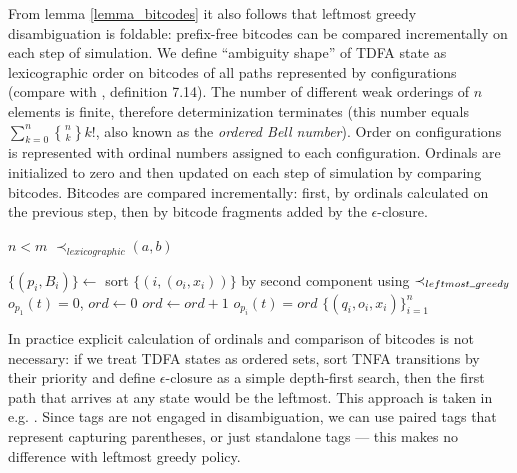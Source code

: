 \documentclass{article}
\newcommand{\Xset}{\!\leftarrow\!}
\newcommand{\Xund}{\rule{.4em}{.4pt}} %
\newcommand{\Xeq}{\!=\!}
\newcommand{\Xstirling}[2]{\genfrac{\{}{\}}{0pt}{}{#1}{#2}}
\theoremstyle{definition}
\begin{document}
\begin{multicols}{2}
From lemma \ref{lemma_bitcodes} it also follows that leftmost greedy disambiguation is foldable:
prefix-free bitcodes can be compared incrementally on each step of simulation.
We define ``ambiguity shape'' of TDFA state as lexicographic order on bitcodes of all paths represented by configurations
(compare with \cite{Gra15}, definition 7.14).
The number of different weak orderings of $n$ elements is finite, therefore determinization terminates
(this number equals $\sum_{k=0}^n \Xstirling{n}{k} k!$, also known as the \emph{ordered Bell number}).
Order on configurations is represented with ordinal numbers assigned to each configuration.
Ordinals are initialized to zero and then updated on each step of simulation by comparing bitcodes.
Bitcodes are compared incrementally:
first, by ordinals calculated on the previous step, then by bitcode fragments added by the $\epsilon$-closure.
\\

    \begin{algorithm}[H] \DontPrintSemicolon {} 
    \Fn {$\underline{\prec_{leftmost \Xund greedy} ((n, a), (m, b))} \smallskip$} {
         {\Return $n \!<\! m$}
        \Return $\prec_{lexicographic} (a, b)$ \;
    }
    \end{algorithm}


    \begin{algorithm}[H] \DontPrintSemicolon {}   
     {
        $\{(p_i, B_i)\} \Xset $ sort $\{(i, (o_i, x_i))\}$ by second component using $\prec_{leftmost \Xund greedy}$ \;
        \Let $o_{p_1}(t) \Xeq 0$, $ord \Xset 0$ \;
        \For {$i \Xeq \overline{2, n}$} {
             {$ord \Xset ord \!+\! 1$}
            \Let $o_{p_i}(t) \Xeq ord$ \;
        }
        \Return $\{(q_i, o_i, x_i)\}_{i=1}^n$ \;
    }
    \end{algorithm}

In practice explicit calculation of ordinals and comparison of bitcodes is not necessary:
if we treat TDFA states as ordered sets,
sort TNFA transitions by their priority
and define $\epsilon$-closure as a simple depth-first search,
then the first path that arrives at any state would be the leftmost.
This approach is taken in e.g. \cite{Kar14}.
Since tags are not engaged in disambiguation,
we can use paired tags that represent capturing parentheses, or just standalone tags --- this makes no difference with leftmost greedy policy.


\end{multicols}
\end{document}
